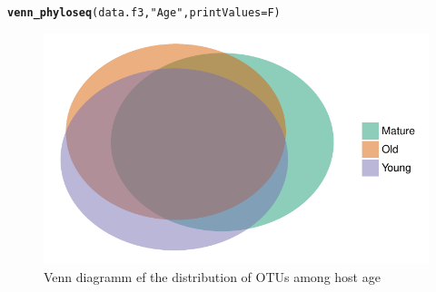 \documentclass[12pt]{article}\usepackage[]{graphicx}\usepackage[]{color}
\makeatletter
\def\maxwidth{ %
  \ifdim\Gin@nat@width>\linewidth
    \linewidth
  \else
    \Gin@nat@width
  \fi
}
\newcommand{\hlstr}[1]{\textcolor[rgb]{0.192,0.494,0.8}{#1}}%
\newcommand{\hlstd}[1]{\textcolor[rgb]{0.345,0.345,0.345}{#1}}%
\newcommand{\hlkwc}[1]{\textcolor[rgb]{0.333,0.667,0.333}{#1}}%
\newcommand{\hlkwd}[1]{\textcolor[rgb]{0.737,0.353,0.396}{\textbf{#1}}}%
\newenvironment{kframe}{%
 \def\at@end@of@kframe{}%
 \ifinner\ifhmode%
  \def\at@end@of@kframe{\end{minipage}}%
  \begin{minipage}{\columnwidth}%
 \fi\fi%
 \def\FrameCommand##1{\hskip\@totalleftmargin \hskip-\fboxsep
 \colorbox{shadecolor}{##1}\hskip-\fboxsep
     \hskip-\linewidth \hskip-\@totalleftmargin \hskip\columnwidth}%
 \MakeFramed {\advance\hsize-\width
   \@totalleftmargin\z@ \linewidth\hsize
   \@setminipage}}%
 {\par\unskip\endMakeFramed%
 \at@end@of@kframe}
\newenvironment{knitrout}{}{} %
\numberwithin{figure}{section}
\makeatother
\begin{document}
\begin{knitrout}\small
{}\color{fgcolor}\begin{kframe}
\begin{alltt}
\hlkwd{venn_phyloseq}\hlstd{(data.f3,} \hlstr{"Age"}\hlstd{,} \hlkwc{printValues} \hlstd{= F)}
\end{alltt}
\end{kframe}\begin{figure}

{\centering \includegraphics[width=\maxwidth]{figure/unnamed-chunk-49-1} 

}

\caption[Venn diagramm ef the distribution of OTUs among host age]{Venn diagramm ef the distribution of OTUs among host age}\label{fig:unnamed-chunk-49}
\end{figure}


\end{knitrout}
\end{document}
